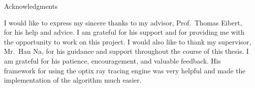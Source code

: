 \thispagestyle{empty}

\vspace*{20mm}

\begin{center}
    { Acknowledgments}
\end{center}

\vspace{10mm}

I would like to express my sincere thanks to my advisor, Prof.\ Thomas Eibert, for his help and advice. 
I am grateful for his support and for providing me with the opportunity to work on this project.
I would also like to thank my supervisor, Mr.\ Han Na, for his guidance and support throughout the course of this thesis. 
I am grateful for his patience, encouragement, and valuable feedback.
His framework for using the optix ray tracing engine was very helpful and made the implementation of the algorithm much easier. 

\cleardoublepage{}
